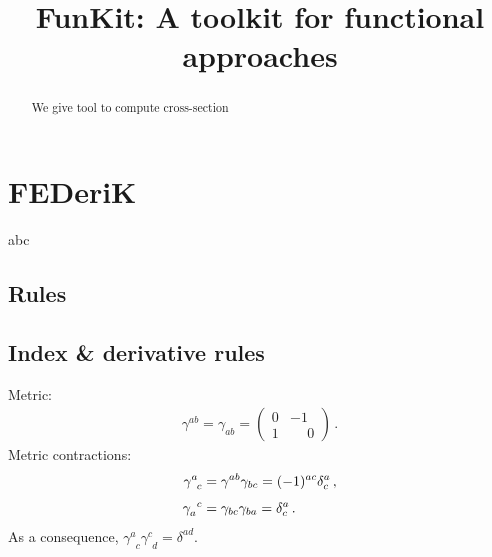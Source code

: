 \documentclass[10pt,prd,nofootinbib,superscriptaddress,twocolumn]{revtex4-2}
\newcommand{\gettitle}{FunKit: A toolkit for functional approaches}
\begin{document}
\title{\gettitle}

\begin{abstract}

We give tool to compute cross-section
\end{abstract}

\maketitle


\section{FED\MakeLowercase{eri}K}

abc


\subsection{Rules}
\label{sec:rules}

\subsection{Index \& derivative rules}
\label{sec:rules_indicesDerivatives}

Metric:
%
\begin{align}
	\gamma^{ab}=\gamma_{ab} = \begin{pmatrix}
		0&-1\\
		1&\phantom{-}0
	\end{pmatrix}
	\,.
\end{align}
%
Metric contractions:
%
\begin{align}
	\gamma^{a}_{\phantom{a}c} &= \gamma^{ab}\gamma_{bc} = (-1)^{ac}\delta^a_c
	\,,\notag\\[1ex]
	\gamma_{a}^{\phantom{a}c} &= \gamma_{bc}\gamma_{ba} = \delta^a_c
	\,.
\end{align}
%
As a consequence, $\gamma^{a}_{\phantom{a}c}\gamma^{c}_{\phantom{c}d} = \delta^{ad}$.
\end{document}
